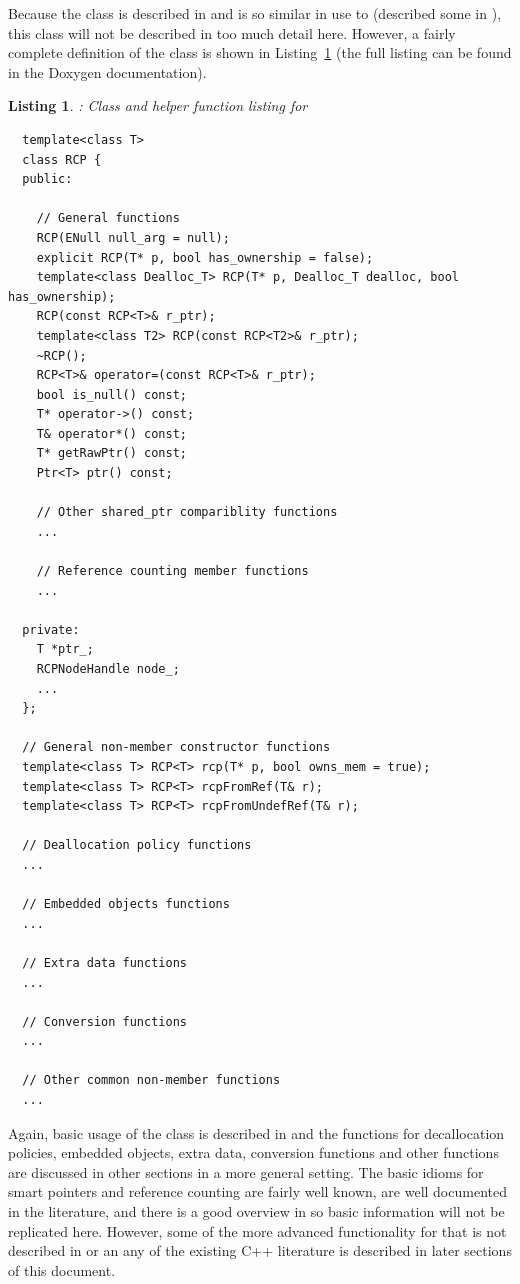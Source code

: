 \documentclass[pdf,ps2pdf,11pt]{SANDreport}
\newtheorem{listing}{Listing}
\begin{document}
Because the class {} is described in
{}\cite{RefCountPtrBeginnersGuide} and is so similar in use to
{} (described some in
{}\cite{EffectiveC++ThirdEdition}), this class will not be described
in too much detail here.  However, a fairly complete definition of the
class {} is shown in Listing~\ref{listing:RCP} (the full
listing can be found in the Doxygen documentation).

\begin{listing}: Class and helper function listing for {} \\
\label{listing:RCP}
{\small\begin{verbatim}
  template<class T>
  class RCP {
  public:

    // General functions
    RCP(ENull null_arg = null);
    explicit RCP(T* p, bool has_ownership = false);
    template<class Dealloc_T> RCP(T* p, Dealloc_T dealloc, bool has_ownership);
    RCP(const RCP<T>& r_ptr);
    template<class T2> RCP(const RCP<T2>& r_ptr);
    ~RCP();
    RCP<T>& operator=(const RCP<T>& r_ptr);
    bool is_null() const;
    T* operator->() const;
    T& operator*() const;
    T* getRawPtr() const;
    Ptr<T> ptr() const;
  
    // Other shared_ptr compariblity functions
    ...
  
    // Reference counting member functions
    ...
  
  private:
    T *ptr_;
    RCPNodeHandle node_;
    ...
  };

  // General non-member constructor functions
  template<class T> RCP<T> rcp(T* p, bool owns_mem = true);
  template<class T> RCP<T> rcpFromRef(T& r);
  template<class T> RCP<T> rcpFromUndefRef(T& r);

  // Deallocation policy functions
  ...

  // Embedded objects functions
  ...

  // Extra data functions
  ...
 
  // Conversion functions
  ...

  // Other common non-member functions
  ...

\end{verbatim}}
\end{listing}

Again, basic usage of the {} class is described in
{}\cite{RefCountPtrBeginnersGuide} and the functions for decallocation
policies, embedded objects, extra data, conversion functions and other
functions are discussed in other sections in a more general setting.
The basic idioms for smart pointers and reference counting are fairly
well known, are well documented in the literature, and there is a good
overview in {}\cite{RefCountPtrBeginnersGuide} so basic information
will not be replicated here.  However, some of the more advanced
functionality for {} that is not described in
{}\cite{RefCountPtrBeginnersGuide} or an any of the existing C++
literature is described in later sections of this document.
\end{document}
